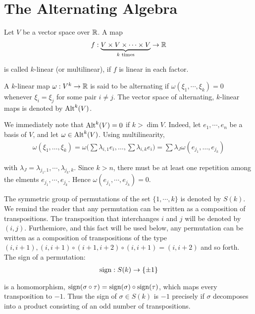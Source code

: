 \chapter{The Alternating Algebra}
Let $V$ be a vector space over $\mathbb{R}$. A map
\begin{align*}
  f: \underbrace{V\times V\times \cdots \times V}_{k\text{ times}} \to \mathbb{R}
\end{align*}

is called $k$-linear (or multilinear), if $f$ is linear in each factor.


\begin{definition}
  A $k$-linear map $\omega: V^k\to\mathbb{R}$ is said to be alternating if
  $\omega(\xi_1, \cdots, \xi_k) = 0$ whenever $\xi_i=\xi_j$ for some pair $i\neq j$. The vector space
  of alternating, $k$-linear maps is denoted by $\operatorname{Alt}^k(V)$.
\end{definition}


We immediately note that $\operatorname{Alt}^k(V) = 0$ if $k > \dim V$. Indeed, let $e_1, \cdots, e_n$ be a
basis of $V$, and let $\omega\in\operatorname{Alt}^k(V)$. Using multilinearity,
\begin{align*}
  \omega(\xi_{1},\ldots,\xi_{k})=\omega\Big(\sum\lambda_{i,1}e_{i},\ldots,\sum\lambda_{i,k}e_{i}\Big)=\sum\lambda_{J}\omega(e_{j_{1}},\ldots,e_{j_{k}})
\end{align*}


with $\lambda_J = \lambda_{j_1, 1}, \cdots, \lambda_{j_k, k}$. Since $k>n$, there must be at least one repetition
among the elments $e_{j_1}, \cdots, e_{j_k}$. Hence $\omega(e_{j_1}, \cdots, e_{j_k}) = 0$.

The symmetric group of permutations of the set $\{1, \cdots,k\}$ is denoted by $S(k)$.
We remind the reader that any permutation can be written as a composition of
transpositions. The transposition that interchanges $i$ and $j$ will be denoted by $(i, j)$.
Furthemiore, and this fact will be used below, any permutation can be written as a
composition of transpositions of the type $(i, i+1), (i, i+1)\circ(i+1, i+2)\circ(i, i+1) =
  (i, i + 2)$ and so forth. The sign of a permutation:
\begin{align}
  \operatorname{sign}: S(k) \to \{\pm 1\}
\end{align}


is a homomorphism, $\operatorname{sign}(\sigma\circ\tau) = \operatorname{sign}(\sigma)\circ\operatorname{sign}(\tau)$, which maps every
transposition to $-1$. Thus the sign of $\sigma\in S(k)$ is $-1$ precisely if $\sigma$ decomposes into a
product consisting of an odd number of transpositions.

